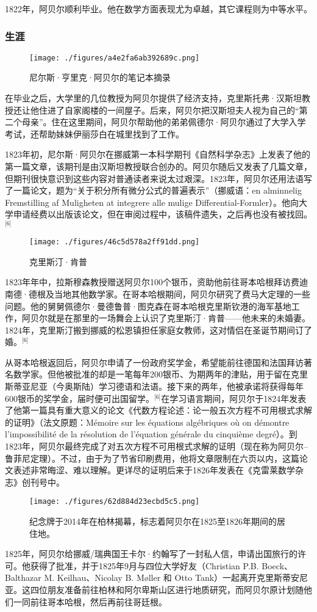1822年，阿贝尔顺利毕业。他在数学方面表现尤为卓越，其它课程则为中等水平。
\subsubsection{生涯}
\begin{figure}[ht]
\centering
\texttt{[image: ./figures/a4e2fa6ab392689c.png]}
\caption{尼尔斯·亨里克·阿贝尔的笔记本摘录} \label{fig_NRSAB_2}
\end{figure}
在毕业之后，大学里的几位教授为阿贝尔提供了经济支持，克里斯托弗·汉斯坦教授还让他住进了自家阁楼的一间屋子。后来，阿贝尔把汉斯坦夫人视为自己的“第二个母亲”。住在这里期间，阿贝尔帮助他的弟弟佩德尔·阿贝尔通过了大学入学考试，还帮助妹妹伊丽莎白在城里找到了工作。

1823年初，尼尔斯·阿贝尔在挪威第一本科学期刊《自然科学杂志》上发表了他的第一篇文章，该期刊是由汉斯坦教授联合创办的。阿贝尔随后又发表了几篇文章，但期刊很快意识到这些内容对普通读者来说太过艰深。1823年，阿贝尔还用法语写了一篇论文，题为“关于积分所有微分公式的普遍表示”（挪威语：en alminnelig Fremstilling af Muligheten at integrere alle mulige Differential-Formler）。他向大学申请经费以出版该论文，但在审阅过程中，该稿件遗失，之后再也没有被找回。\(^\text{[6]}\)
\begin{figure}[ht]
\centering
\texttt{[image: ./figures/46c5d578a2ff91dd.png]}
\caption{克里斯汀·肯普} \label{fig_NRSAB_3}
\end{figure}
1823年年中，拉斯穆森教授赠送阿贝尔100个银币，资助他前往哥本哈根拜访费迪南德·德根及当地其他数学家。在哥本哈根期间，阿贝尔研究了费马大定理的一些问题。他的舅舅佩德尔·曼德鲁普·图克森在哥本哈根克里斯钦港的海军基地工作，阿贝尔就是在那里的一场舞会上认识了克里斯汀·肯普——他未来的未婚妻。1824年，克里斯汀搬到挪威的松恩镇担任家庭女教师，这对情侣在圣诞节期间订了婚。\(^\text{[6]}\)

从哥本哈根返回后，阿贝尔申请了一份政府奖学金，希望能前往德国和法国拜访著名数学家。但他被批准的却是一笔每年200银币、为期两年的津贴，用于留在克里斯蒂亚尼亚（今奥斯陆）学习德语和法语。接下来的两年，他被承诺将获得每年600银币的奖学金，届时便可出国留学。\(^\text{[6]}\)在学习语言期间，阿贝尔于1824年发表了他第一篇具有重大意义的论文《代数方程论述：论一般五次方程不可用根式求解的证明》（法文原题：Mémoire sur les équations algébriques où on démontre l'impossibilité de la résolution de l'équation générale du cinquième degré）。到1823年，阿贝尔最终完成了对五次方程不可用根式求解的证明（现在称为阿贝尔–鲁菲尼定理）。不过，由于为了节省印刷费用，他将文章限制在六页以内，这篇论文表述非常晦涩、难以理解。更详尽的证明后来于1826年发表在《克雷莱数学杂志》创刊号中。
\begin{figure}[ht]
\centering
\texttt{[image: ./figures/62d884d23ecbd5c5.png]}
\caption{纪念牌于2014年在柏林揭幕，标志着阿贝尔在1825至1826年期间的居住地。} \label{fig_NRSAB_4}
\end{figure}
1825年，阿贝尔给挪威/瑞典国王卡尔·约翰写了一封私人信，申请出国旅行的许可。他获得了批准，并于1825年9月与四位大学好友（Christian P.B. Boeck、Balthazar M. Keilhau、Nicolay B. Møller 和 Otto Tank）一起离开克里斯蒂安尼亚。这四位朋友准备前往柏林和阿尔卑斯山区进行地质研究，而阿贝尔原计划随他们一同前往哥本哈根，然后再前往哥廷根。

